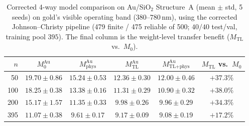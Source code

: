 \documentclass[a4paper,fleqn]{cas-sc}
\newcommand{\Mzero}{M_0}
\newcommand{\Mphys}{M_\text{phys}}
\newcommand{\Mtl}{M_\text{TL}}
\newcommand{\Mtlphys}{M_\text{TL+phys}}
\begin{document}
\begin{table}[htbp]\centering\small
\caption{Corrected 4-way model comparison on Au/SiO$_2$ Structure~A (mean $\pm$ std, 5 seeds) on gold's visible operating band ($380$--$780$\,nm), using the corrected Johnson--Christy pipeline (479 finite / 475 reliable of 500; $40/40$ test/val, training pool $395$). The final column is the weight-level transfer benefit ($\Mtl$ vs.\ $\Mzero$).}
\label{tab:material_gen}
\begin{tabular}{r cccc c}\toprule
$n$ & $\Mzero^\text{Au}$ & $\Mphys^\text{Au}$ & $\Mtl^\text{Au}$ & $\Mtlphys^\text{Au}$ & $\Mtl$ vs.\ $\Mzero$\\\midrule
50  & $19.70 \pm 0.86$ & $15.24 \pm 0.53$ & $12.36 \pm 0.30$ & $\mathbf{12.00 \pm 0.46}$ & $+37.3\%$\\
100 & $18.25 \pm 0.38$ & $13.38 \pm 0.16$ & $11.31 \pm 0.29$ & $\mathbf{10.90 \pm 0.32}$ & $+38.0\%$\\
200 & $15.17 \pm 1.57$ & $11.35 \pm 0.33$ & $9.98 \pm 0.26$ & $\mathbf{9.96 \pm 0.29}$ & $+34.3\%$\\
395 & $11.07 \pm 0.38$ & $9.61 \pm 0.17$ & $9.17 \pm 0.09$ & $\mathbf{9.08 \pm 0.19}$ & $+17.2\%$\\\bottomrule
\end{tabular}
\end{table}
\end{document}

